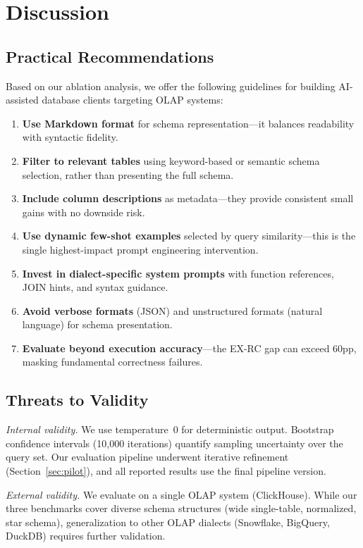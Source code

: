 \documentclass[sigconf, nonacm]{acmart}
\begin{document}
\section{Discussion}
\label{sec:discussion}

\subsection{Practical Recommendations}
Based on our ablation analysis, we offer the following guidelines for building AI-assisted database clients targeting OLAP systems:
\begin{enumerate}
    \item \textbf{Use Markdown format} for schema representation---it balances readability with syntactic fidelity.
    \item \textbf{Filter to relevant tables} using keyword-based or semantic schema selection, rather than presenting the full schema.
    \item \textbf{Include column descriptions} as metadata---they provide consistent small gains with no downside risk.
    \item \textbf{Use dynamic few-shot examples} selected by query similarity---this is the single highest-impact prompt engineering intervention.
    \item \textbf{Invest in dialect-specific system prompts} with function references, JOIN hints, and syntax guidance.
    \item \textbf{Avoid verbose formats} (JSON) and unstructured formats (natural language) for schema presentation.
    \item \textbf{Evaluate beyond execution accuracy}---the EX-RC gap can exceed 60pp, masking fundamental correctness failures.
\end{enumerate}

\subsection{Threats to Validity}
\emph{Internal validity.} We use temperature~0 for deterministic output. Bootstrap confidence intervals (10{,}000 iterations) quantify sampling uncertainty over the query set. Our evaluation pipeline underwent iterative refinement (Section~\ref{sec:pilot}), and all reported results use the final pipeline version.

\emph{External validity.} We evaluate on a single OLAP system (ClickHouse). While our three benchmarks cover diverse schema structures (wide single-table, normalized, star schema), generalization to other OLAP dialects (Snowflake, BigQuery, DuckDB) requires further validation.
\end{document}
